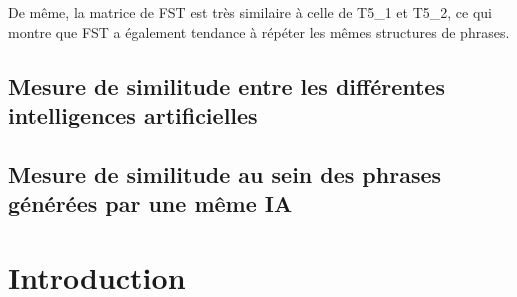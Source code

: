 \documentclass[11pt]{article}
\begin{document}
\vspace{5mm}

De même, la matrice de FST est très similaire à celle de T5\_1 et T5\_2, ce qui montre que FST a également tendance à répéter les mêmes structures de phrases.

\subsection {Mesure de similitude entre les différentes intelligences artificielles}



\subsection {Mesure de similitude au sein des phrases générées par une même IA}
\subsection {}
\subsection {}
\subsection {}

\section {Introduction}





\vspace{5mm}
\end{document}
